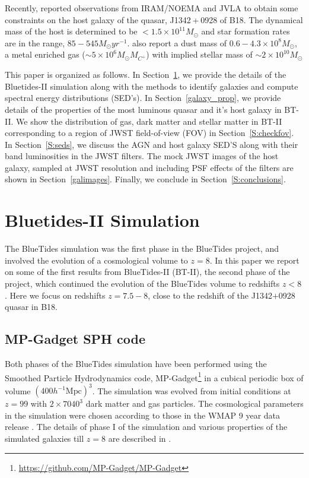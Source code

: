 \documentclass[twocolumn,useAMS,usenatbib]{mnras} \usepackage{natbib}
\newcommand{\hmpc}{\ensuremath{h^{-1}\mathrm{Mpc}}}
\begin{document}
 Recently, \cite{2017ApJ...851L...8V} reported observations from IRAM/NOEMA and JVLA to obtain some constraints on the host galaxy of the quasar, J1342 + 0928 of B18.  The  dynamical mass of the host is determined to be $< 1.5 \times 10^{11} M_{\odot}$ and star formation rates are in the range, $85-545 M_{\odot} yr^{-1}$. \cite{2017ApJ...851L...8V} also report a dust mass of $0.6-4.3 \times 10^{8}M_{\odot}$, a metal enriched gas ($\sim 5 \times 10^{6} M_{\odot} M_{C^{+}}$) with implied stellar mass of $\sim 2 \times 10^{10} M_{\odot}$   
 
This paper is organized as follows. In Section~\ref{S:Simulation}, we provide the details of the Bluetides-II simulation along with the methods to identify galaxies and compute spectral energy distributions (SED's). In Section~\ref{galaxy_prop}, we provide details of the properties of the most luminous quasar and it's host galaxy in BT-II. We show the distribution of gas, dark matter and stellar matter in BT-II corresponding to a region of JWST field-of-view (FOV) in Section~\ref{S:checkfov}. In Section~\ref{S:seds}, we discuss the AGN and host galaxy SED'S along with their band luminosities in the JWST filters. The mock JWST images of the host galaxy, sampled at JWST resolution and including PSF effects of the filters are shown in Section~\ref{galimages}. Finally, we conclude in Section~\ref{S:conclusions}.

\section{Bluetides-II Simulation} \label{S:Simulation}
 
The BlueTides simulation \citep{2016MNRAS.455.2778F} was the first phase in the BlueTides project, and involved the evolution of a cosmological volume to $z=8$. 
In this paper we report on some of the first results from BlueTides-II (BT-II), the second phase of the project, which continued the evolution of the BlueTides
volume to redshifts $z<8$. Here we focus on redshifts $z=7.5-8$, close to the redshift of the J1342$+$0928 quasar in B18.

\subsection{MP-Gadget SPH code}

Both phases of the BlueTides simulation have been performed using the Smoothed Particle Hydrodynamics code, MP-Gadget\footnote{\url{https://github.com/MP-Gadget/MP-Gadget}} \citep{2016MNRAS.455.2778F} in a cubical periodic box of volume $(400 \hmpc)^{3}$. The simulation was evolved from initial conditions at $z=99$ with $2 \times 7040^{3}$ dark matter and gas particles. The cosmological parameters in the simulation were chosen according to those in the  WMAP 9 year data release \citep{2013ApJS..208...19H}. The details of phase I of the  simulation and various properties of the simulated galaxies till $z=8$ are described in \cite{2016MNRAS.455.2778F}.
\end{document}
